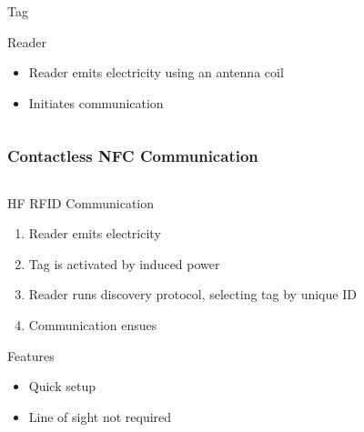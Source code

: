 \documentclass[unknownkeysallowed]{beamer}
\begin{document}
\begin{frame}
\begin{columns}[T]
\begin{column}{.5\textwidth}
\begin{block}{Tag}
\begin{itemize}
   		\end{itemize}
    	\end{block}
        \begin{block}{Reader}
    	\begin{itemize}
		    \item{Reader emits electricity using an antenna coil}
		    \item{Initiates communication}
   		\end{itemize}
    \end{block}
    \end{column}
  \end{columns}
\end{frame}


\begin{frame}
\frametitle{Contactless NFC Communication}
  \begin{center}\begin{minipage}{.9\textwidth}
  \begin{columns}[T]
    \begin{column}{.5\textwidth}
     \begin{block}{HF RFID Communication}
		\begin{enumerate}
		    \item{Reader emits electricity}
		    \item{Tag is activated by induced power}
        	\item{Reader runs discovery protocol, selecting tag by unique ID}
        	\item{Communication ensues}
   		\end{enumerate}
    \end{block}
         \begin{block}{Features}
		\begin{itemize}
        	\item{Quick setup}
        	\item{Line of sight not required}
   		\end{itemize}
    \end{block}
    \end{column}
    \begin{column}{.5\textwidth}
    \begin{block}{}
     \begin{center}

\end{center}
\end{block}
\end{column}
\end{columns}
\end{minipage}
\end{center}
\end{frame}
\end{document}
